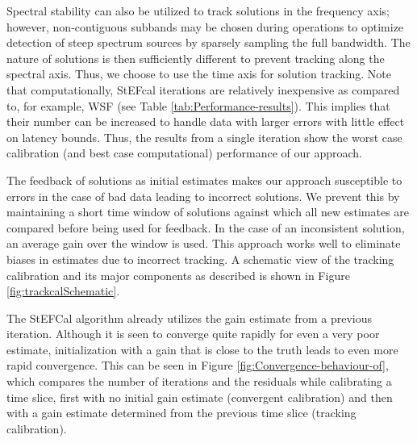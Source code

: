 \documentclass[referee]{aa}
\begin{document}
Spectral  stability can also  be utilized  to track  solutions in  the frequency
axis;  however,  non-contiguous subbands  may  be  chosen  during operations  to
optimize  detection of  steep spectrum  sources  by sparsely  sampling the  full
bandwidth. The  nature of  solutions is then  sufficiently different  to prevent
tracking  along the spectral  axis. Thus,  we choose  to use  the time  axis for
solution tracking. Note that  computationally, StEFcal iterations are relatively
inexpensive    as    compared    to,     for    example,    WSF    (see    Table
\ref{tab:Performance-results}).  This implies that their number can be increased
to handle data  with larger errors with little effect  on latency bounds.  Thus,
the results  from a single iteration  show the worst case  calibration (and best
case computational) performance of our approach.

The feedback of solutions as initial estimates makes our approach susceptible to
errors in the case of bad  data leading to incorrect solutions.  We prevent this
by maintaining a short time window  of solutions against which all new estimates
are compared  before being used  for feedback.  In  the case of  an inconsistent
solution, an average gain over the  window is used.  This approach works well to
eliminate biases in estimates due to incorrect tracking. A schematic view of the
tracking calibration  and its major components  as described is  shown in Figure
\ref{fig:trackcalSchematic}.

The  StEFCal  algorithm already  utilizes  the  gain  estimate from  a  previous
iteration. Although  it is seen to converge  quite rapidly for even  a very poor
estimate, initialization  with a gain that is  close to the truth  leads to even
more     rapid    convergence.      This     can    be     seen    in     Figure
\ref{fig:Convergence-behaviour-of}, which compares  the number of iterations and
the  residuals  while calibrating  a  time slice,  first  with  no initial  gain
estimate (convergent calibration)  and then with a gain  estimate determined from
the previous time slice (tracking calibration).
\end{document}
